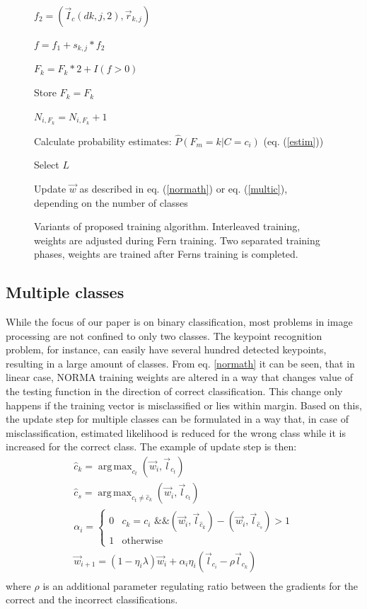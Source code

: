 \documentclass[10pt,twocolumn, a4paper]{article}
\DeclareMathOperator*{\argmax}{arg\,max}
\begin{document}
\begin{figure}[ht]
{{\begin{minipage}{0.4\textwidth}
\begin{algorithmic}
   $f_2=(\vec{I}_c(d{k,j,2}),\vec{r}_{k,j})$

$f=f_1+s_{k,j}*f_2$

$F_k=F_k*2+I(f>0)$
\EndFor

Store $F_{k}=F_k$

$N_{i,F_k}=N_{i,F_k}+1$
\EndFor
 \EndFor
\EndFor

Calculate probability estimates: $\hat{P}(F_m=k|C=c_i)$  (eq. (\ref{estim}))

Select $L$

\Repeat

Update $\vec{w}$ as described in eq. (\ref{normath}) or eq. (\ref{multic}), depending on the number of classes

 \end{algorithmic}
\end{minipage}}
\label{separ}
}
\caption{Variants of proposed training algorithm. \protect {} Interleaved training, weights are adjusted during Fern training. \protect {} Two separated training phases, weights are trained after Ferns training is completed.}
\label{training}
\end{figure}

\subsection{Multiple classes}
\label{multiclass}
While the focus of our paper is on binary classification, most problems in image processing are not confined to only two classes. The keypoint recognition problem, for instance, can easily have several hundred detected keypoints, resulting in a large amount of classes. 
From eq. \ref{normath} it can be seen, that in linear case, NORMA training weights are altered in a way that changes value of the testing function in the direction of correct classification. This change only happens if the training vector is misclassified or lies within margin. Based on this, the update step for multiple classes can be formulated in a way that, in case of misclassification, estimated likelihood is reduced for the wrong class while it is increased for the correct class. The example of update step is then:
\begin{equation}
\begin{array}{l}
\hat{c}_k=\argmax_{c_t}{ (\vec{w}_{i},\vec{l}_{c_t})}\\
\hat{c}_s=\argmax_{c_t\ne\hat{c}_k}{ (\vec{w}_{i},\vec{l}_{c_t})}\\
\alpha_i=\left\{ \begin{array}{rl}
0 &  c_k=c_i \mbox{ \&\& } (\vec{w}_{i},\vec{l}_{\hat{c}_k})-(\vec{w}_{i},\vec{l}_{\hat{c}_s})>1 \\
1 & \mbox{otherwise}
\end{array} \right.\\
\vec{w}_{i+1}=(1-\eta_i \lambda )\vec{w}_i +\alpha_i \eta_i (\vec{l}_{c_i}-\rho \vec{l}_{c_k}) \\
\end{array}
\label{multic}
\end{equation}
where $\rho$ is an additional parameter regulating ratio between the gradients for the correct and the incorrect classifications. 
\end{document}
